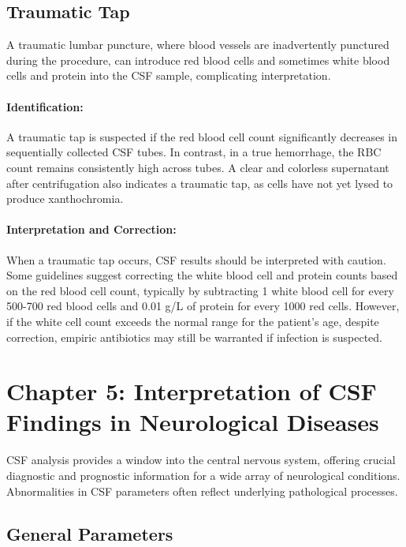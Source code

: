	\subsection*{Traumatic Tap}
	
	A traumatic lumbar puncture, where blood vessels are inadvertently punctured during the procedure, can introduce red blood cells and sometimes white blood cells and protein into the CSF sample, complicating interpretation.
	
	\paragraph{Identification:} A traumatic tap is suspected if the red blood cell count significantly decreases in sequentially collected CSF tubes. In contrast, in a true hemorrhage, the RBC count remains consistently high across tubes. A clear and colorless supernatant after centrifugation also indicates a traumatic tap, as cells have not yet lysed to produce xanthochromia.
	
	\paragraph{Interpretation and Correction:} When a traumatic tap occurs, CSF results should be interpreted with caution. Some guidelines suggest correcting the white blood cell and protein counts based on the red blood cell count, typically by subtracting 1 white blood cell for every 500-700 red blood cells and 0.01 g/L of protein for every 1000 red cells. However, if the white cell count exceeds the normal range for the patient's age, despite correction, empiric antibiotics may still be warranted if infection is suspected.
	
	\section*{Chapter 5: Interpretation of CSF Findings in Neurological Diseases}
	
	CSF analysis provides a window into the central nervous system, offering crucial diagnostic and prognostic information for a wide array of neurological conditions. Abnormalities in CSF parameters often reflect underlying pathological processes.
	
	\subsection*{General Parameters}
	
